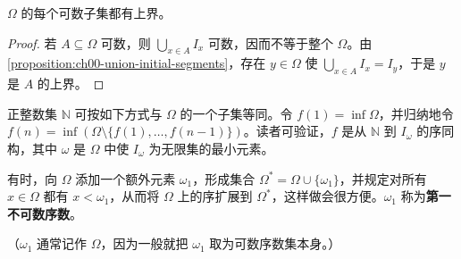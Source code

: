 \documentclass[../../main.tex]{subfiles}%
\begin{document}
\begin{proposition}\label{proposition:ch00-countable-ordinals-bounded}
$\Omega$ 的每个可数子集都有上界。
\end{proposition}

\begin{proof}
若 $A\subseteq\Omega$ 可数，则 $\bigcup_{x\in A}I_x$ 可数，因而不等于整个 $\Omega$。由\cref{proposition:ch00-union-initial-segments}，存在 $y\in\Omega$ 使 $\bigcup_{x\in A}I_x=I_y$，于是 $y$ 是 $A$ 的上界。
\end{proof}

正整数集 $\mathbb{N}$ 可按如下方式与 $\Omega$ 的一个子集等同。令 $f(1)=\inf\Omega$，并归纳地令 $f(n)=\inf(\Omega\setminus\{f(1),\ldots,f(n-1)\})$。读者可验证，$f$ 是从 $\mathbb{N}$ 到 $I_\omega$ 的序同构，其中 $\omega$ 是 $\Omega$ 中使 $I_\omega$ 为无限集的最小元素。


\begin{definition}[第一不可数序数]\label{definition:ch00-first-uncountable-ordinal}
有时，向 $\Omega$ 添加一个额外元素 $\omega_1$，形成集合 $\Omega^*=\Omega\cup\{\omega_1\}$，并规定对所有 $x\in\Omega$ 都有 $x<\omega_1$，从而将 $\Omega$ 上的序扩展到 $\Omega^*$，这样做会很方便。$\omega_1$ 称为\textbf{第一不可数序数}。
\end{definition}

\begin{remark}
（$\omega_1$ 通常记作 $\Omega$，因为一般就把 $\omega_1$ 取为可数序数集本身。）
\end{remark}
\end{document}
